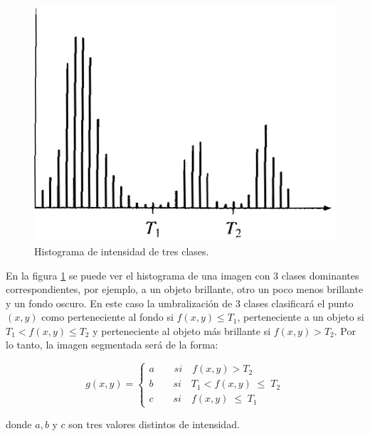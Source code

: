\begin{figure}[hbt]
\begin{center}
\includegraphics[scale=0.4]{img/hist3clases.png}
\end{center}
\caption{Histograma de intensidad de tres clases\cite{segment}.}
\label{hist3class}
\end{figure}

En la figura \ref{hist3class} se puede ver el histograma de una imagen con 3 clases dominantes correspondientes, por ejemplo, a un objeto brillante, otro un poco menos brillante y un fondo oscuro. En este caso la umbralización de 3 clases clasificará el punto $(x,y)$ como perteneciente al fondo si $f(x,y){\leq}T_1$, perteneciente a un objeto si $T_1 < f(x,y){\leq}T_2$ y perteneciente al objeto más brillante si $f(x,y)>T_2$. Por lo tanto, la imagen segmentada será de la forma:

\begin{equation}
g(x,y) = \left\{
\begin{array}{l}
\displaystyle a{\qquad}si{\quad}f(x,y) > {T_2}\\
\displaystyle b{\qquad}si{\quad}{T_1} < f(x,y)\;{\leq}\;{T_2}\\
\displaystyle c{\qquad}si{\quad}f(x,y)\;{\leq}\;{T_1}
\end{array} 
\right.
\label{eq:xdef3}
\end{equation}

donde $a,b$ y $c $ son tres valores distintos de intensidad.

